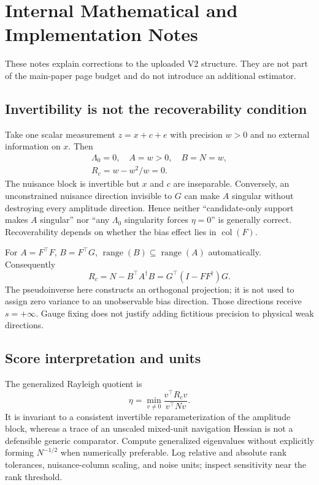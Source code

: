 \documentclass[conference]{IEEEtran}
\newif\iftechnicalnotes
\begin{document}
\iftechnicalnotes
\clearpage
\appendices
\section{Internal Mathematical and Implementation Notes}
\label{app:math}
These notes explain corrections to the uploaded V2 structure. They are not part of the main-paper page budget and do not introduce an additional estimator.

\subsection{Invertibility is not the recoverability condition}
Take one scalar measurement $z=x+c+e$ with precision $w>0$ and no external information on $x$. Then
\begin{equation}
 \begin{gathered}
 \Lambda_0=0,\quad A=w>0,\quad B=N=w,\\
 R_c=w-w^2/w=0.
 \end{gathered}
\end{equation}
The nuisance block is invertible but $x$ and $c$ are inseparable. Conversely, an unconstrained nuisance direction invisible to $G$ can make $A$ singular without destroying every amplitude direction. Hence neither ``candidate-only support makes $A$ singular'' nor ``any $\Lambda_0$ singularity forces $\eta=0$'' is generally correct. Recoverability depends on whether the bias effect lies in $\operatorname{col}(F)$.

For $A=F^\top F$, $B=F^\top G$, $\operatorname{range}(B)\subseteq\operatorname{range}(A)$ automatically. Consequently
\begin{equation}
 R_c=N-B^\top A^\dagger B=G^\top(I-FF^\dagger)G.
\end{equation}
The pseudoinverse here constructs an orthogonal projection; it is not used to assign zero variance to an unobservable bias direction. Those directions receive $s=+\infty$. Gauge fixing does not justify adding fictitious precision to physical weak directions.

\subsection{Score interpretation and units}
The generalized Rayleigh quotient is
\begin{equation}
 \eta=\min_{v\ne0}\frac{v^\top R_cv}{v^\top Nv}.
\end{equation}
It is invariant to a consistent invertible reparameterization of the amplitude block, whereas a trace of an unscaled mixed-unit navigation Hessian is not a defensible generic comparator. Compute generalized eigenvalues without explicitly forming $N^{-1/2}$ when numerically preferable. Log relative and absolute rank tolerances, nuisance-column scaling, and noise units; inspect sensitivity near the rank threshold.
\end{document}
